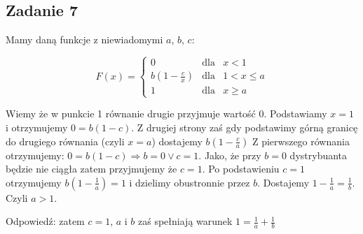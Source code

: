 \subsection{Zadanie 7}

Mamy daną funkcje z niewiadomymi $a$, $b$, $c$:

$$
F(x) = \left\{
\begin{array}{rcl} 0 & \text{dla} & x < 1\\
b(1-\frac{c}{x}) & \text{dla} & 1 < x \leq a\\
1 & \text{dla} & x \geq a
\end{array}
\right.
$$

Wiemy że w punkcie 1 równanie drugie przyjmuje wartość 0. Podstawiamy $x = 1$ i otrzymujemy  $0 = b(1 - c)$.
Z drugiej strony zaś gdy podstawimy górną granicę do drugiego równania (czyli $x = a$) dostajemy
$b(1 - \frac{c}{a})$
Z pierwszego równania otrzymujemy: $0 = b(1-c) \Rightarrow b = 0 \vee c = 1$. Jako, że przy $b = 0$
dystrybuanta będzie nie ciągła zatem przyjmujemy że $c = 1$. 
Po podstawieniu $c = 1$ otrzymujemy $b(1-\frac{1}{a}) = 1$ i dzielimy obustronnie przez $b$. Dostajemy $1 - \frac{1}{a} = \frac{1}{b}$. Czyli $a > 1$. 
 
Odpowiedź: zatem $c = 1$, $a$ i $b$ zaś spełniają warunek $1 = \frac{1}{a} + \frac{1}{b}$ 
